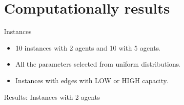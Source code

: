 \documentclass[aspectratio=169]{beamer}
\begin{document}
\section{Computationally results}

\begin{frame}{Instances}
	\begin{itemize}
		\setlength\itemsep{1em}
		\item 10 instances with 2 agents and 10 with 5 agents.
		\item All the parameters selected from uniform distributions.
		\item Instances with edges with LOW or HIGH capacity.
	\end{itemize}
\end{frame}

\begin{frame}{Results: Instances with 2 agents}

\end{frame}
\end{document}
